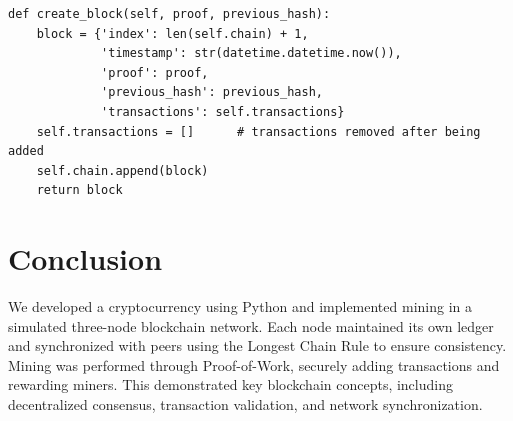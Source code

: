 \documentclass[12pt,a4paper]{article}
\begin{document}
{\renewcommand{\baselinestretch}{0.85}\selectfont
\begin{lstlisting}[style=pythonstyle]
def create_block(self, proof, previous_hash):
    block = {'index': len(self.chain) + 1,
             'timestamp': str(datetime.datetime.now()),
             'proof': proof,
             'previous_hash': previous_hash,
             'transactions': self.transactions}
    self.transactions = []      # transactions removed after being added
    self.chain.append(block)
    return block
\end{lstlisting}
}

\section{Conclusion}
We developed a cryptocurrency using Python and implemented mining in a simulated three-node blockchain network. Each node maintained its own ledger and synchronized with peers using the Longest Chain Rule to ensure consistency. Mining was performed through Proof-of-Work, securely adding transactions and rewarding miners. This demonstrated key blockchain concepts, including decentralized consensus, transaction validation, and network synchronization.
\end{document}
